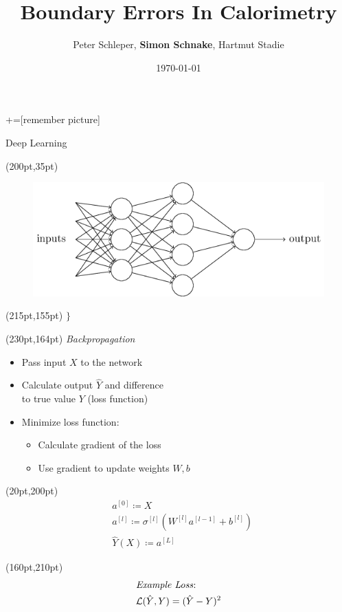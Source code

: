 \documentclass[10pt]{beamer}
\title{Boundary Errors In Calorimetry}
\date{\today}
\author{Peter Schleper, \textbf{Simon Schnake}, Hartmut Stadie}
\institute{Universität Hamburg}
\begin{document}
\maketitle
{}+=[remember picture]

\begin{frame}{Deep Learning}
  \begin{textblock*}{150pt}(200pt,35pt)
    \begin{figure}[htp]
      \includegraphics[width=\textwidth]{../images/tikz1.png}
    \end{figure}
  \end{textblock*}
  \begin{textblock*}{150pt}(215pt,155pt)
    \Huge{$\}$}
  \end{textblock*}
  \begin{textblock*}{150pt}(230pt,164pt)
    \emph{Backpropagation}
  \end{textblock*}
  \begin{itemize}
  \item Pass input $X$ to the network
  \item Calculate output $\hat{Y}$ and difference\\ to true value $Y$ (loss function)
  \item Minimize loss function:
    \begin{itemize}
    \item Calculate gradient of the loss
    \item Use gradient to update weights $W, b$
    \end{itemize}
  \end{itemize}
  \begin{textblock*}{150pt}(20pt,200pt)
    \begin{align*}
      &a^{[0]} \coloneqq X \\
      &a^{[l]} \coloneqq \sigma^{[l]}(W^{[l]} a^{[l-1]}+ b^{[l]})\\
      &\hat{Y}(X) \coloneqq a^{[L]}
    \end{align*}
  \end{textblock*}

  \begin{textblock*}{170pt}(160pt,210pt)
    \begin{align*}
      &\text{\emph{Example Loss}:}\\
      &\mathcal{L}(\hat{Y}, Y) = (\hat{Y} - Y)^2
    \end{align*}
  \end{textblock*}
\end{frame}
\end{document}
